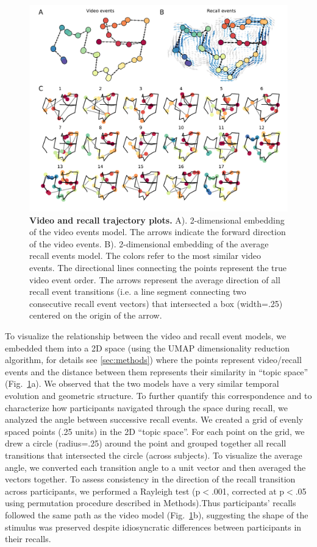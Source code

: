 \documentclass{article}
\begin{document}
{\begin{figure}[t!]
\centering
\includegraphics[width=1\textwidth]{figs/4_trajectory.pdf}
\caption{\small \textbf{Video and recall trajectory plots.} A). 2-dimensional embedding of the video events model. The arrows indicate the forward direction of the video events. B). 2-dimensional embedding of the average recall events model.  The colors refer to the most similar video events. The directional lines connecting the points represent the true video event order. The arrows represent the average direction of all recall event transitions (i.e. a line segment connecting two consecutive recall event vectors) that intersected a box (width=.25) centered on the origin of the arrow.}
\label{fig:trajectory}
\end{figure}

To visualize the relationship between the video and recall event models, we embedded them into a 2D space (using the UMAP dimensionality reduction algorithm, for details see \ref{sec:methods}) where the points represent video/recall events and the distance between them represents their similarity in ``topic space'' (Fig.~\ref{fig:trajectory}a).   We observed that the two models have a very similar temporal evolution and geometric structure. To further quantify this correspondence and to characterize how participants navigated through the space during recall, we analyzed the angle between successive recall events. We created a grid of evenly spaced points (.25 units) in the 2D ``topic space''. For each point on the grid, we drew a circle (radius=.25) around the point and grouped together all recall transitions that intersected the circle (across subjects). To visualize the average angle, we converted each transition angle to a unit vector and then averaged the vectors together. To assess consistency in the direction of the recall transition across participants, we performed a Rayleigh test (p$<$.001, corrected at p$<$.05 using permutation procedure described in Methods).Thus participants' recalls followed the same path as the video model (Fig.~\ref{fig:trajectory}b), suggesting the shape of the stimulus was preserved despite idiosyncratic differences between participants in their recalls.

}
\end{document}
